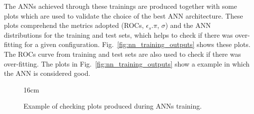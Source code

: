 The ANNs achieved through these trainings are produced together with some plots which are used to validate the choice of the best ANN architecture. These plots comprehend the metrics adopted (ROCs, $\epsilon_{s}.\pi$, $\sigma$) and the ANN distributions for the training and test sets, which helps to check if there was over-fitting for a given configuration. Fig.~\ref{fig:nn_training_outputs} shows these plots. The ROCs curve from training and test sets are also used to check if there was over-fitting. The plots in Fig.~\ref{fig:nn_training_outputs} show a example in which the ANN is considered good.

\begin{figure}[hbtp]{16cm}
	\caption{Example of checking plots produced during ANNs training.}
	\centering		
	\subfloat[]{
}
\end{figure}
